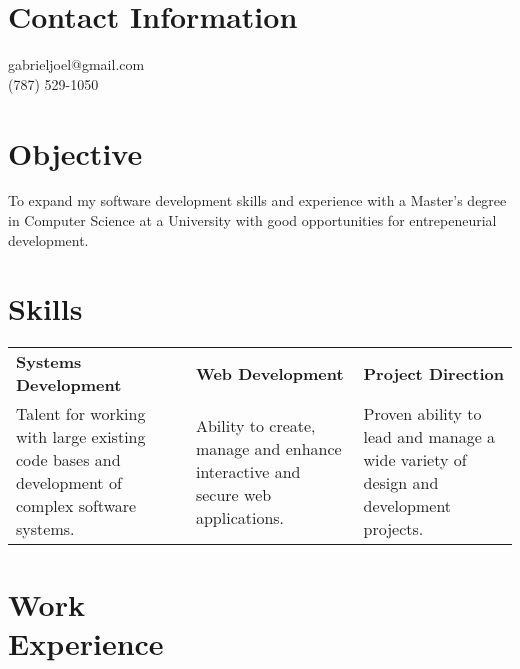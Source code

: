 \documentclass[margin,line]{res}
\begin{document}


\begin{resume}
\section{\sc Contact Information}
\vspace{.05in}
gabrieljoel@gmail.com \\
(787) 529-1050       



\section{\sc Objective}
To expand my software development skills and experience with a Master's degree in Computer Science at a University with good opportunities for entrepeneurial development.  
\section{\sc Skills}
\begin{tabular}{@{}p{2in}p{2in}p{1.7in}}
{\bf Systems Development}             & {\bf Web Development}  & {\bf Project Direction} \\            
Talent for working with large existing code bases and development of complex software systems. & Ability to create, manage and enhance interactive and secure web applications. & Proven ability to lead and manage a wide variety of design and development projects.   
\end{tabular}


\section{\sc Work \\Experience}


\end{resume}
\end{document}
